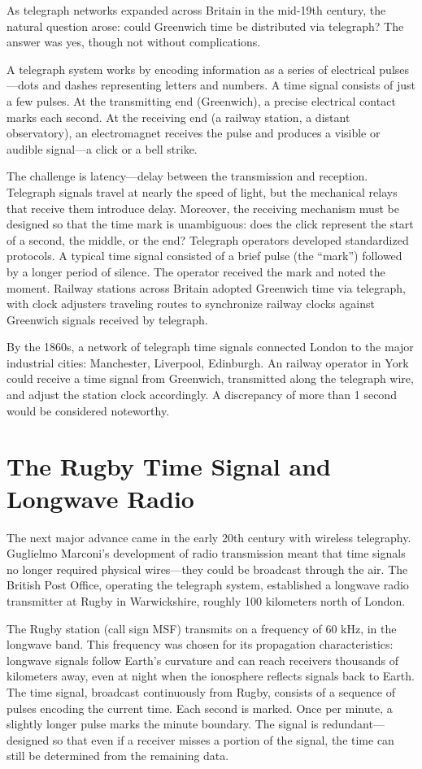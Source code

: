 As telegraph networks expanded across Britain in the mid-19th century, the natural question arose: could Greenwich time be distributed via telegraph? The answer was yes, though not without complications.

A telegraph system works by encoding information as a series of electrical pulses—dots and dashes representing letters and numbers. A time signal consists of just a few pulses. At the transmitting end (Greenwich), a precise electrical contact marks each second. At the receiving end (a railway station, a distant observatory), an electromagnet receives the pulse and produces a visible or audible signal—a click or a bell strike.

The challenge is latency—delay between the transmission and reception. Telegraph signals travel at nearly the speed of light, but the mechanical relays that receive them introduce delay. Moreover, the receiving mechanism must be designed so that the time mark is unambiguous: does the click represent the start of a second, the middle, or the end? Telegraph operators developed standardized protocols. A typical time signal consisted of a brief pulse (the ``mark'') followed by a longer period of silence. The operator received the mark and noted the moment. Railway stations across Britain adopted Greenwich time via telegraph, with clock adjusters traveling routes to synchronize railway clocks against Greenwich signals received by telegraph.

By the 1860s, a network of telegraph time signals connected London to the major industrial cities: Manchester, Liverpool, Edinburgh. An railway operator in York could receive a time signal from Greenwich, transmitted along the telegraph wire, and adjust the station clock accordingly. A discrepancy of more than 1 second would be considered noteworthy.

\section{The Rugby Time Signal and Longwave Radio}

The next major advance came in the early 20th century with wireless telegraphy. Guglielmo Marconi's development of radio transmission meant that time signals no longer required physical wires—they could be broadcast through the air. The British Post Office, operating the telegraph system, established a longwave radio transmitter at Rugby in Warwickshire, roughly 100 kilometers north of London.

The Rugby station (call sign MSF) transmits on a frequency of 60 kHz, in the longwave band. This frequency was chosen for its propagation characteristics: longwave signals follow Earth's curvature and can reach receivers thousands of kilometers away, even at night when the ionosphere reflects signals back to Earth. The time signal, broadcast continuously from Rugby, consists of a sequence of pulses encoding the current time. Each second is marked. Once per minute, a slightly longer pulse marks the minute boundary. The signal is redundant—designed so that even if a receiver misses a portion of the signal, the time can still be determined from the remaining data.

